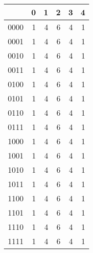 \begin{tabular}{lrrrrr}
\toprule
 & 0 & 1 & 2 & 3 & 4 \\
\midrule
0000 & 1 & 4 & 6 & 4 & 1 \\
0001 & 1 & 4 & 6 & 4 & 1 \\
0010 & 1 & 4 & 6 & 4 & 1 \\
0011 & 1 & 4 & 6 & 4 & 1 \\
0100 & 1 & 4 & 6 & 4 & 1 \\
0101 & 1 & 4 & 6 & 4 & 1 \\
0110 & 1 & 4 & 6 & 4 & 1 \\
0111 & 1 & 4 & 6 & 4 & 1 \\
1000 & 1 & 4 & 6 & 4 & 1 \\
1001 & 1 & 4 & 6 & 4 & 1 \\
1010 & 1 & 4 & 6 & 4 & 1 \\
1011 & 1 & 4 & 6 & 4 & 1 \\
1100 & 1 & 4 & 6 & 4 & 1 \\
1101 & 1 & 4 & 6 & 4 & 1 \\
1110 & 1 & 4 & 6 & 4 & 1 \\
1111 & 1 & 4 & 6 & 4 & 1 \\
\bottomrule
\end{tabular}
